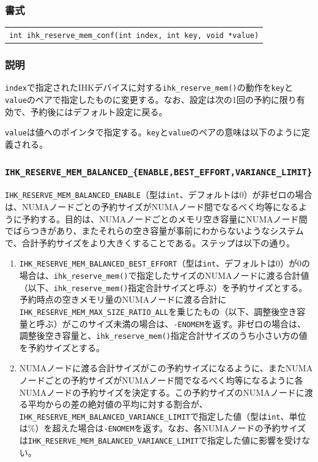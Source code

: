 \documentclass[twoside,11pt,fleqn]{book}
\begin{document}
\subsubsection*{書式}
\begin{tabular}[t]{@{}l@{}}
{\quad} \texttt{int ihk\_reserve\_mem\_conf(int index, int key, void *value)}\\
\end{tabular}
\subsubsection*{説明}{\quad} \texttt{index}で指定されたIHKデバイスに対する\texttt{ihk\_reserve\_mem()}の動作を\texttt{key}と\texttt{value}のペアで指定したものに変更する。なお、設定は次の1回の予約に限り有効で、予約後にはデフォルト設定に戻る。

\texttt{value}は値へのポインタで指定する。\texttt{key}と\texttt{value}のペアの意味は以下のように定義される。

\subsubsection*{\texttt{IHK\_RESERVE\_MEM\_BALANCED\_\{ENABLE,BEST\_EFFORT,VARIANCE\_LIMIT\}}}
\verb|IHK_RESERVE_MEM_BALANCED_ENABLE|（型は\verb|int|、デフォルトは0）が非ゼロの場合は、NUMAノードごとの予約サイズがNUMAノード間でなるべく均等になるように予約する。目的は、NUMAノードごとのメモリ空き容量にNUMAノード間でばらつきがあり、またそれらの空き容量が事前にわからないようなシステムで、合計予約サイズをより大きくすることである。ステップは以下の通り。
\begin{enumerate}
\item \verb|IHK_RESERVE_MEM_BALANCED_BEST_EFFORT|（型は\verb|int|、デフォルトは0）が0の場合は、\verb|ihk_reserve_mem()|で指定したサイズのNUMAノードに渡る合計値（以下、\verb|ihk_reserve_mem()|指定合計サイズと呼ぶ）を予約サイズとする。予約時点の空きメモリ量のNUMAノードに渡る合計に\texttt{IHK\_RESERVE\_MEM\_MAX\_SIZE\_RATIO\_ALL}を乗じたもの（以下、調整後空き容量と呼ぶ）がこのサイズ未満の場合は、\texttt{-ENOMEM}を返す。非ゼロの場合は、調整後空き容量と、\verb|ihk_reserve_mem()|指定合計サイズのうち小さい方の値を予約サイズとする。
\item NUMAノードに渡る合計サイズがこの予約サイズになるように、またNUMAノードごとの予約サイズがNUMAノード間でなるべく均等になるように各NUMAノードの予約サイズを決定する。この予約サイズのNUMAノードに渡る平均からの差の絶対値の平均に対する割合が、\verb|IHK_RESERVE_MEM_BALANCED_VARIANCE_LIMIT|で指定した値（型は\verb|int|、単位は\%）を超えた場合は\texttt{-ENOMEM}を返す。なお、各NUMAノードの予約サイズは\verb|IHK_RESERVE_MEM_BALANCED_VARIANCE_LIMIT|で指定した値に影響を受けない。
\end{enumerate}
\end{document}
